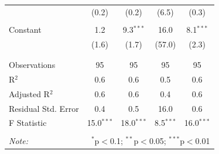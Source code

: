 \documentclass[12pt, a4paper]{article}
\begin{document}
\begin{table}[!htbp]
\begin{tabular}{@{\extracolsep{5pt}}lcccc}
  & (0.2) & (0.2) & (6.5) & (0.3) \\ 
  & & & & \\ 
 Constant & 1.2 & 9.3$^{***}$ & 16.0 & 8.1$^{***}$ \\ 
  & (1.6) & (1.7) & (57.0) & (2.3) \\ 
  & & & & \\ 
\hline \\[-1.8ex] 
Observations & 95 & 95 & 95 & 95 \\ 
R$^{2}$ & 0.6 & 0.6 & 0.5 & 0.6 \\ 
Adjusted R$^{2}$ & 0.6 & 0.6 & 0.4 & 0.6 \\ 
Residual Std. Error & 0.4 & 0.5 & 16.0 & 0.6 \\ 
F Statistic & 15.0$^{***}$ & 18.0$^{***}$ & 8.5$^{***}$ & 16.0$^{***}$ \\ 
\hline 
\hline \\[-1.8ex] 
\textit{Note:}  & \multicolumn{4}{r}{$^{*}$p$<$0.1; $^{**}$p$<$0.05; $^{***}$p$<$0.01} \\ 
\end{tabular} 
\end{table} %
\end{document}
